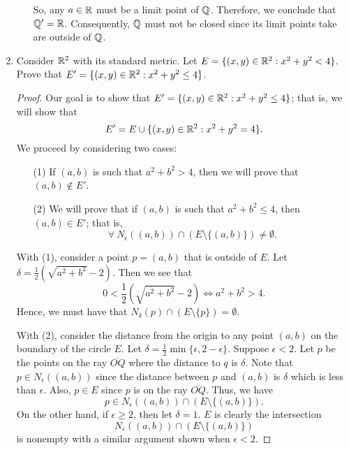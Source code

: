 \documentclass[a4paper]{article}
\begin{document}
\begin{enumerate}
\begin{enumerate}
\begin{solution}
                So, any \( a \in \mathbb{R}  \) must be a limit point of \( \mathbb{Q}  \). Therefore, we conclude that \( \mathbb{Q}'= \mathbb{R}  \). Consequently, \( \mathbb{Q}  \) must not be closed since its limit points take are outside of \( \mathbb{Q} \). 
                \end{solution}
        \end{enumerate}
    \item Consider \( \mathbb{R}^{2}  \) with its standard metric. Let \( E = \{ (x,y) \in \mathbb{R}^{2} : x^{2} + y^{2} < 4  \}  \). Prove that \( E' = \{ (x,y) \in \mathbb{R}^{2} : x^{2} + y^{2} \leq 4  \}  \).
        \begin{proof}
            Our goal is to show that \( E' = \{ (x,y) \in \mathbb{R}^{2} : x^{2} + y^{2} \leq 4  \}  \); that is, we will show that 
            \[  E' = E \cup \{ (x,y) \in \mathbb{R}^{2} : x^{2} + y^{2} = 4  \}.  \]
            We proceed by considering two cases:
            \begin{enumerate}
                \item[(1)] If \( (a,b)  \) is such that \( a^{2} + b^{2} > 4  \), then we will prove that \( (a,b) \notin E' \).
                \item[(2)] We will prove that if \( (a,b) \) is such that \( a^{2} + b^{2} \leq 4  \), then \( (a,b) \in E' \); that is,   
                    \[  \forall \ {N}_{\epsilon}((a,b)) \cap (E \setminus  \{ (a,b) \} ) \neq \emptyset. \] 
            \end{enumerate}
            With (1), consider a point \( p = (a,b) \) that is outside of \( E  \). Let \( \delta = \frac{ 1 }{ 2 }  (\sqrt{ a^{2} + b^{2} } - 2 ) \). Then we see that    
            \[  0 < \frac{ 1 }{ 2 } (\sqrt{ a^{2} + b^{2} }  - 2 ) \Longleftrightarrow a^{2} + b^{2} > 4.    \]
            Hence, we must have that \( {N}_{\delta}(p) \cap (E \setminus \{ p \} ) = \emptyset. \)

            With (2), consider the distance from the origin to any point \( (a,b) \) on the boundary of the circle \( E  \). Let \( \delta = \frac{ 1 }{ 2 } \min \{ \epsilon, 2 - \epsilon \}   \). Suppose \( \epsilon < 2  \). Let \( p \) be the points on the ray \( \overline{OQ} \) where the distance to \( q  \) is \( \delta \). Note that \( p \in {N}_{\epsilon}((a,b))   \) since the distance between \( p  \) and \( (a,b) \) is \( \delta \) which is less than \( \epsilon  \). Also, \( p \in E  \) since \( p  \) is on the ray \( \overline{OQ} \). Thus, we have 
            \[  p \in {N}_{\epsilon}((a,b)) \cap (E \setminus  \{ (a,b) \} ). \]
            On the other hand, if \( \epsilon \geq 2  \), then let \( \delta = 1  \). \( E  \) is clearly the intersection   
            \[  {N}_{\epsilon}((a,b)) \cap (E \setminus  \{ (a,b) \} ) \]
            is nonempty with a similar argument shown when \( \epsilon  < 2  \).


\end{proof}
\end{enumerate}
\end{document}
